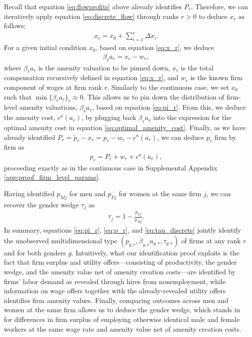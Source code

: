 Recall that equation \eqref{eq:flowprofits} above already identifies $P_{r}$. Therefore, we can iteratively apply equation \eqref{eq:discrete_flow} through ranks $r > 0$ to deduce $x_{r}$ as follows:
%
\begin{align}
    x_{r} = x_{0} + \sum_{i=1}^{r} \Delta x_{i}. \label{eq:x_r}
\end{align}
%
For a given initial condition $x_{0}$, based on equation \eqref{eq:x_r}, we deduce
%
\begin{align}
    \beta_{r} a_{r} = x_{r} - w_{r}, \label{eq:pi_r}
\end{align}
%
where $\beta_{r} a_{r}$ is the amenity valuation to be pinned down, $x_{r}$ is the total compensation recursively defined in equation \eqref{eq:x_r}, and $w_{r}$ is the known firm component of wages at firm rank $r$. Similarly to the continuous case, we set $x_{0}$ such that $\min\{ \beta_{r} a_{r} \}_{r} \approx 0$. This allows us to pin down the distribution of firm-level amenity valuations, $\beta_{r} a_{r}$, based on equation \eqref{eq:pi_r}. From this, we deduce the amenity cost, $c^{a}(a_{r})$, by plugging back $\beta_{r} a_{r}$ into the expression for the optimal amenity cost in equation \eqref{eq:optimal_amenity_cost}. Finally, as we have already identified $P_{r} = \tilde{p}_{r} - x_{r} = p_{r} - w_{r} - c^{a}(a_{r})$, we can deduce $p_{r}$ firm by firm as
%
\begin{align}
    p_{r} = P_{r} + w_{r} + c^{a}(a_{r}), \label{eq:p_r}
\end{align}
%
proceeding exactly as in the continuous case in Supplemental Appendix \ref{app:proof_firm_level_params}.

Having identified $p_{Mj}$ for men and $p_{Fj}$ for women at the same firm $j$, we can recover the gender wedge $\tau_{j}$ as
%
\begin{align}
    \tau_{j} = 1 - \frac{p_{Fj}}{p_{Mj}}. \label{eq:tau_discrete}
\end{align}
%
In summary, equations \eqref{eq:pi_r}, \eqref{eq:p_r}, and \eqref{eq:tau_discrete} jointly identify the unobserved multidimensional type $(p_{g,r}, \beta_{g,r} a_{g,r}, \tau_{g,r})$ of firms at any rank $r$ and for both genders $g$. Intuitively, what our identification proof exploits is the fact that firm surplus and utility offers---consisting of productivity, the gender wedge, and the amenity value net of amenity creation costs---are identified by firms' labor demand as revealed through hires from nonemployment, while information on wage offers together with the already-revealed utility offers identifies firm amenity values. Finally, comparing outcomes across men and women at the same firm allows us to deduce the gender wedge, which stands in for differences in firm surplus of employing otherwise identical male and female workers at the same wage rate and amenity value net of amenity creation costs.


